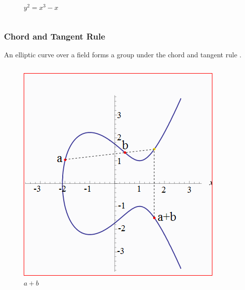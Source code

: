 \documentclass[xcolor=pdftex,dvipsnames,table]{beamer}
\theoremstyle{plain}
\theoremstyle{definition}
\begin{document}
\begin{frame}
\begin{columns}
\begin{figure}
		\caption{$y^2=x^3-x$}
	\end{figure}
	\end{columns}
\end{frame}

\begin{frame}
	\frametitle{Chord and Tangent Rule}

	An elliptic curve over a field forms a group under the chord and tangent rule \cite{Galbraith}.
	\begin{columns}
	\begin{figure}
		\centering
		\includegraphics[scale=.2]{p_plus_q.png}
		\caption{$a+b$}
	\end{figure}


\end{columns}
\end{frame}
\end{document}
